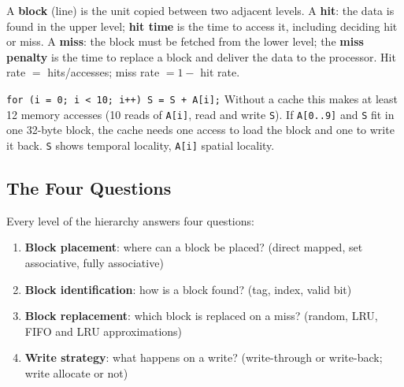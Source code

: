 \begin{definition}
A \textbf{block} (line) is the unit copied between two adjacent levels. A
\textbf{hit}: the data is found in the upper level; \textbf{hit time} is the time
to access it, including deciding hit or miss. A \textbf{miss}: the block must be
fetched from the lower level; the \textbf{miss penalty} is the time to replace a
block and deliver the data to the processor. Hit rate $=$ hits/accesses; miss rate
$=1-$ hit rate.
\end{definition}

\begin{eg}
\texttt{for (i = 0; i < 10; i++) S = S + A[i];} Without a cache this makes at
least 12 memory accesses (10 reads of \texttt{A[i]}, read and write \texttt{S}). If
\texttt{A[0..9]} and \texttt{S} fit in one 32-byte block, the cache needs one
access to load the block and one to write it back. \texttt{S} shows temporal
locality, \texttt{A[i]} spatial locality.
\end{eg}

\subsection{The Four Questions}
\label{sec:four-questions}

Every level of the hierarchy answers four questions:
\begin{enumerate}
  \item \textbf{Block placement}: where can a block be placed? (direct mapped,
  set associative, fully associative)
  \item \textbf{Block identification}: how is a block found? (tag, index, valid bit)
  \item \textbf{Block replacement}: which block is replaced on a miss? (random,
  LRU, FIFO and LRU approximations)
  \item \textbf{Write strategy}: what happens on a write? (write-through or
  write-back; write allocate or not)
\end{enumerate}

